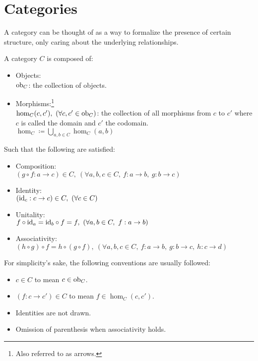 \section{Categories}
A category can be thought of as a way to formalize the presence of certain
structure, only caring about the underlying relationships.

\begin{definition}[Category]
  A category $C$ is composed of: \parencite{fong_spivak:7sketches}
  \begin{itemize}
    \item Objects:\\
      $\mathrm{ob}_C$: the collection of objects.
    \item Morphisms:\footnote{Also referred to as arrows.}\\
      $\hom_C(c, c'),\ (\forall c, c' \in \mathrm{ob}_C)$: the collection of all
      morphisms from $c$ to $c'$ where $c$ is called the domain and $c'$ the
      codomain.\\
      $\hom_C \coloneqq \bigcup\limits_{a,b\in C} \hom_C(a,b)$
  \end{itemize}

  Such that the following are satisfied:
  \begin{itemize}
    \item Composition:\\
      $(g \circ f : a \to c) \in C,
        \ (\forall a, b, c \in C,\ f: a \to b,\ g:b \to c)$
    \item Identity:\\
      $(\mathrm{id}_c: c \to c) \in C,\ (\forall c \in C)$
    \item Unitality:\\
      $f \circ \mathrm{id}_a = \mathrm{id}_b \circ f = f,
        \ (\forall a, b \in C,\ f: a \to b)$
    \item Associativity:\\
      $(h \circ g) \circ f = h \circ (g \circ f), \ (\forall a,b,c\in C,\ f:a\to
        b,\ g:b\to c,\ h:c\to d)$
  \end{itemize}
\end{definition}

\begin{remark}
  For simplicity's sake, the following conventions are usually followed:
  \begin{itemize}
    \item $c\in C$ to mean $c\in\mathrm{ob}_C$.
    \item $(f: c\to c')\in C$ to mean $f\in \hom_C(c, c')$.
    \item Identities are not drawn.
    \item Omission of parenthesis when associativity holds.
  \end{itemize}
\end{remark}

